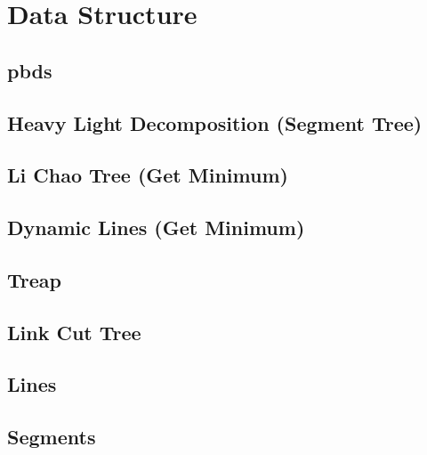 \section{Data Structure}

\subsection{pbds}


\subsection{Heavy Light Decomposition (Segment Tree)}


\subsection{Li Chao Tree (Get Minimum)}


\subsection{Dynamic Lines (Get Minimum)}


\subsection{Treap}

\subsection{Link Cut Tree}

\subsection{Lines}

\subsection{Segments}

